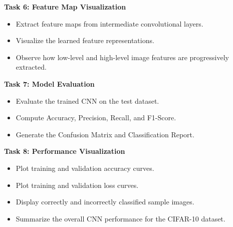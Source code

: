 \documentclass[11pt]{article}
\begin{document}
\bigskip

\textbf{Task 6: Feature Map Visualization}

\begin{itemize}
    \item Extract feature maps from intermediate convolutional layers.
    \item Visualize the learned feature representations.
    \item Observe how low-level and high-level image features are progressively extracted.
\end{itemize}


\bigskip

\textbf{Task 7: Model Evaluation}

\begin{itemize}
    \item Evaluate the trained CNN on the test dataset.
    \item Compute Accuracy, Precision, Recall, and F1-Score.
    \item Generate the Confusion Matrix and Classification Report.
\end{itemize}


\bigskip

\textbf{Task 8: Performance Visualization}

\begin{itemize}
    \item Plot training and validation accuracy curves.
    \item Plot training and validation loss curves.
    \item Display correctly and incorrectly classified sample images.
    \item Summarize the overall CNN performance for the CIFAR-10 dataset.
\end{itemize}




\end{document}
